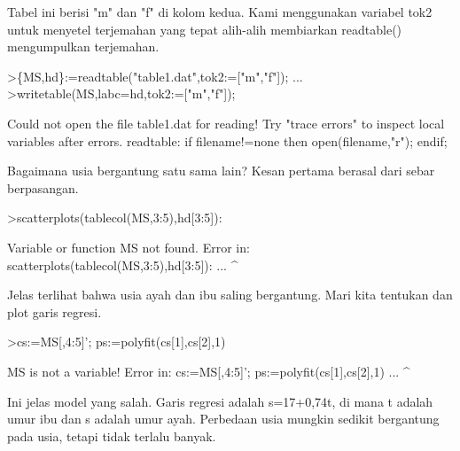 \documentclass[a4paper,10pt]{article}
\begin{document}
\begin{eulernotebook}
\begin{eulercomment}
\begin{eulercomment}
\begin{eulercomment}
\begin{eulercomment}
\begin{eulercomment}
\begin{eulercomment}
\begin{eulercomment}
\begin{eulercomment}
\begin{eulercomment}
\begin{eulercomment}
\begin{eulercomment}
\begin{eulercomment}
\begin{eulercomment}
\begin{eulercomment}
\begin{eulercomment}
\begin{eulercomment}
\begin{eulercomment}
\begin{eulercomment}
\begin{eulercomment}
Tabel ini berisi "m" dan "f" di kolom kedua. Kami menggunakan variabel
tok2 untuk menyetel terjemahan yang tepat alih-alih membiarkan
readtable() mengumpulkan terjemahan.
\end{eulercomment}
\begin{eulerprompt}
>\{MS,hd\}:=readtable("table1.dat",tok2:=["m","f"]);  ...
>writetable(MS,labc=hd,tok2:=["m","f"]);
\end{eulerprompt}
\begin{euleroutput}
  Could not open the file
  table1.dat
  for reading!
  Try "trace errors" to inspect local variables after errors.
  readtable:
      if filename!=none then open(filename,"r"); endif;
\end{euleroutput}
\begin{eulercomment}
Bagaimana usia bergantung satu sama lain? Kesan pertama berasal dari
sebar berpasangan.
\end{eulercomment}
\begin{eulerprompt}
>scatterplots(tablecol(MS,3:5),hd[3:5]):
\end{eulerprompt}
\begin{euleroutput}
  Variable or function MS not found.
  Error in:
  scatterplots(tablecol(MS,3:5),hd[3:5]): ...
                          ^
\end{euleroutput}
\begin{eulercomment}
Jelas terlihat bahwa usia ayah dan ibu saling bergantung. Mari kita
tentukan dan plot garis regresi.
\end{eulercomment}
\begin{eulerprompt}
>cs:=MS[,4:5]'; ps:=polyfit(cs[1],cs[2],1)
\end{eulerprompt}
\begin{euleroutput}
  MS is not a variable!
  Error in:
  cs:=MS[,4:5]'; ps:=polyfit(cs[1],cs[2],1) ...
              ^
\end{euleroutput}
\begin{eulercomment}
Ini jelas model yang salah. Garis regresi adalah s=17+0,74t, di mana t
adalah umur ibu dan s adalah umur ayah. Perbedaan usia mungkin sedikit
bergantung pada usia, tetapi tidak terlalu banyak.


\end{eulercomment}
\end{eulercomment}
\end{eulercomment}
\end{eulercomment}
\end{eulercomment}
\end{eulercomment}
\end{eulercomment}
\end{eulercomment}
\end{eulercomment}
\end{eulercomment}
\end{eulercomment}
\end{eulercomment}
\end{eulercomment}
\end{eulercomment}
\end{eulercomment}
\end{eulercomment}
\end{eulercomment}
\end{eulercomment}
\end{eulercomment}
\end{eulernotebook}
\end{document}
